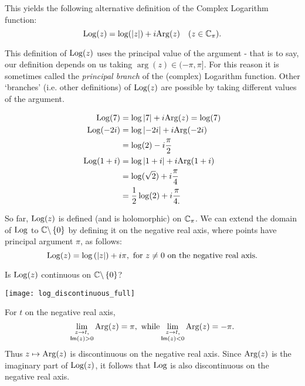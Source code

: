 This yields the following alternative definition of the Complex Logarithm function:
\begin{equation}
\operatorname{Log} (z) = \log ( \left| z \right| )+i \mathrm{Arg} (z) \quad (z \in \mathbb{C}_{\pi}).
\end{equation}
\begin{note}
This definition of $\operatorname{Log} (z)$ uses the principal value of the argument - that is to say, our definition depends on us taking $\arg (z) \in (-\pi, \pi]$.  For this reason it is sometimes called the \emph{principal branch} of the (complex) Logarithm function.  Other `branches' (i.e. other definitions) of $\operatorname{Log} (z)$ are possible by taking different values of the argument.
\end{note}
\begin{example}
\begin{align*}
\operatorname{Log} (7) & = \log \left| 7 \right| + i \mathrm{Arg} (z) = \log(7) \\
\operatorname{Log} (-2i) & = \log \left| -2i \right| + i \mathrm{Arg} (-2i) \\
& = \log(2) -i \frac{\pi}{2} \\
\operatorname{Log} (1+i ) & = \log \left| 1+i \right| + i \mathrm{Arg} (1+i) \\
& = \log ( \sqrt{2} ) + i \frac{\pi}{4} \\
& = \frac{1}{2} \log (2) + i \frac{\pi}{4.}
\end{align*}
\end{example}

So far, $\operatorname{Log} (z)$ is defined (and is holomorphic) on $\mathbb{C}_{\pi}$. We can extend the domain of $\operatorname{Log}$ to $\mathbb{C} \backslash\left\{0\right\}$ by defining it on the negative real axis, where points have principal argument $\pi$, as follows:
\[
\operatorname{Log} (z) = \log \left( \left| z \right| \right) + i \pi, \mbox{ for $z \neq 0$ on the negative real axis.}
\]
\begin{questions}
\question
Is $\operatorname{Log}(z)$ continuous on $\mathbb{C} \backslash \left\{0\right\}$?
\end{questions}

\begin{center}
\texttt{[image: log\_discontinuous\_full]}
\end{center}
For $t$ on the negative real axis,
\[
\lim_{\substack{z \to t, \\  \textsf{Im} (z) > 0 }} \mathrm{Arg} (z) = \pi, \text{ while} \lim_{\substack{z \to t, \\ \textsf{Im}(z)<0}} \mathrm{Arg} (z) = -\pi.
\]
Thus $z \mapsto \mathrm{Arg} (z)$ is discontinuous on the negative real axis.  Since $\mathrm{Arg} (z)$ is the imaginary part of $\operatorname{Log}(z)$, it follows that $\operatorname{Log}$ is also discontinuous on the negative real axis.

